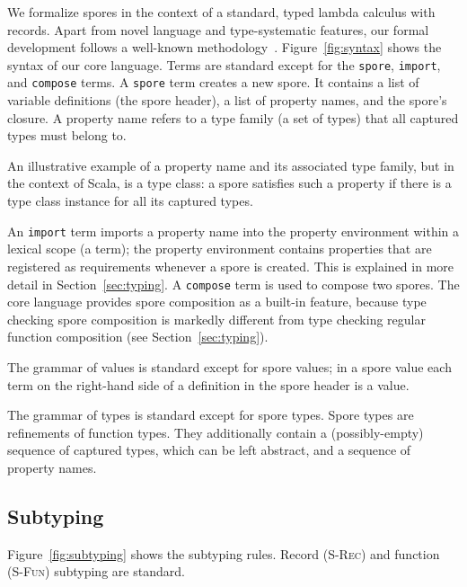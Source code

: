 \documentclass{llncs}
\begin{document}
We formalize spores in the context of a standard, typed lambda calculus with records. Apart from novel language and type-systematic features, our formal development follows a well-known methodology~\cite{TAPL}. Figure~\ref{fig:syntax} shows the syntax of our core language. Terms are standard except for the \texttt{spore}, \texttt{import}, and \texttt{compose} terms. A \texttt{spore} term creates a new spore. It contains a list of variable definitions (the spore header), a list of property names, and the spore's closure. A property name refers to a type family (a set of types) that all captured types must belong to.

An illustrative example of a property name and its associated type family, but in the context of Scala, is a type class: a spore satisfies such a property if there is a type class instance for all its captured types.

An \texttt{import} term imports a property name into the property environment
within a lexical scope (a term); the property environment contains properties
that are registered as requirements whenever a spore is created. This is
explained in more detail in Section~\ref{sec:typing}. A \texttt{compose} term
is used to compose two spores. The core language provides spore composition as
a built-in feature, because type checking spore composition is markedly
different from type checking regular function composition (see
Section~\ref{sec:typing}).

The grammar of values is standard except for spore values; in a spore value each term on the right-hand side of a definition in the spore header is a value.

The grammar of types is standard except for spore types. Spore types are refinements of function types. They additionally contain a (possibly-empty) sequence of captured types, which can be left abstract, and a sequence of property names.

\subsection{Subtyping}\label{sec:subtyping}

Figure~\ref{fig:subtyping} shows the subtyping rules. Record (\textsc{S-Rec}) and function (\textsc{S-Fun}) subtyping are standard.
\end{document}
